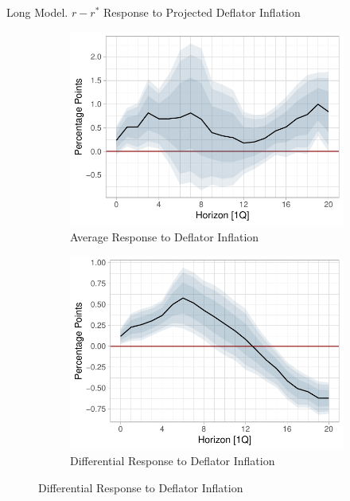 \documentclass[10pt,aspectratio=169]{beamer}
\begin{document}
\begin{frame}{Long Model. $r-r^*$ Response to Projected Deflator Inflation}

    \begin{figure}[!htbp]\centering
        \begin{minipage}{\textwidth}
        \caption{}
        \begin{subfigure}[b]{0.48\textwidth}
            \centering
            \caption{Average Response to Deflator Inflation}
            \label{fig:LP_long:average_inflation}
            \includegraphics[width=\linewidth]{average_deflator_inflation_long.pdf}
        \end{subfigure}
        \hfill
        \begin{subfigure}[b]{0.48\textwidth}
            \centering 
            \caption{Differential Response to Deflator Inflation}
            \label{fig:LP_long:differential_inflation}
            \includegraphics[width=\linewidth]{differential_deflator_inflation_long.pdf}

\end{subfigure}
\end{minipage}
\end{figure}
\end{frame}
\end{document}
